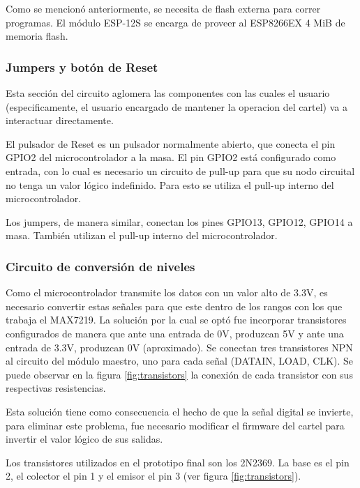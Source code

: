 Como se mencionó anteriormente, se necesita de flash externa para correr programas. El módulo ESP-12S se encarga de proveer al ESP8266EX 4 MiB de memoria flash.

\subsubsection{Jumpers y botón de Reset}
Esta sección del circuito aglomera las componentes con las cuales el usuario (especificamente, el usuario encargado de mantener la operacion del cartel) va a interactuar directamente.

El pulsador de Reset es un pulsador normalmente abierto, que conecta el pin GPIO2 del microcontrolador a la masa. El pin GPIO2 está configurado como entrada, con lo cual es necesario un circuito de pull-up para que su nodo circuital no tenga un valor lógico indefinido. Para esto se utiliza el pull-up interno del microcontrolador.

Los jumpers, de manera similar, conectan los pines GPIO13, GPIO12, GPIO14 a masa. También utilizan el pull-up interno del microcontrolador.


\subsubsection{Circuito de conversión de niveles} \label{sec:transistores}
Como el microcontrolador transmite los datos con un valor alto de 3.3V, es necesario convertir estas señales para que este dentro de los rangos con los que trabaja el MAX7219. La solución por la cual se optó fue incorporar transistores configurados de manera que ante una entrada de 0V, produzcan 5V y ante una entrada de 3.3V, produzcan 0V (aproximado). Se conectan tres transistores NPN al circuito del módulo maestro, uno para cada señal (DATAIN, LOAD, CLK). Se puede observar en la figura \ref{fig:transistors} la conexión de cada transistor con sus respectivas resistencias. 

Esta solución tiene como consecuencia el hecho de que la señal digital se invierte, para eliminar este problema, fue necesario modificar el firmware del cartel para invertir el valor lógico de sus salidas.

Los transistores utilizados en el prototipo final son los 2N2369. %
La base es el pin 2, el colector el pin 1 y el emisor el pin 3 (ver figura \ref{fig:transistors}).

